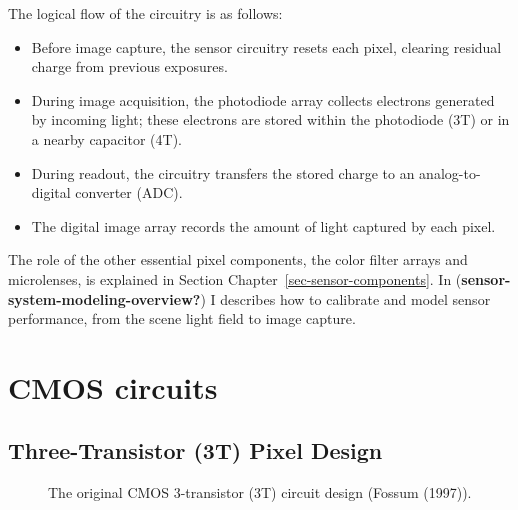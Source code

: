 \documentclass[
  letterpaper,
]{book}
\providecommand{\tightlist}{%
  \setlength{\itemsep}{0pt}\setlength{\parskip}{0pt}}\usepackage{longtable,booktabs,array}
\begin{document}
The logical flow of the circuitry is as follows:

\begin{itemize}
\tightlist
\item
  Before image capture, the sensor circuitry resets each pixel, clearing
  residual charge from previous exposures.
\item
  During image acquisition, the photodiode array collects electrons
  generated by incoming light; these electrons are stored within the
  photodiode (3T) or in a nearby capacitor (4T).
\item
  During readout, the circuitry transfers the stored charge to an
  analog-to-digital converter (ADC).
\item
  The digital image array records the amount of light captured by each
  pixel.
\end{itemize}

The role of the other essential pixel components, the color filter
arrays and microlenses, is explained in Section
Chapter~\ref{sec-sensor-components}. In
(\textbf{sensor-system-modeling-overview?}) I describes how to calibrate
and model sensor performance, from the scene light field to image
capture.

\section{CMOS circuits}\label{sec-sensor-circuits}

\subsection{Three-Transistor (3T) Pixel
Design}\label{sec-3T-pixel-design}

\begin{figure}


\caption{\label{fig-sensor-3T-circuit}The original CMOS 3-transistor
(3T) circuit design (Fossum (1997)).}

\end{figure}%
\end{document}
